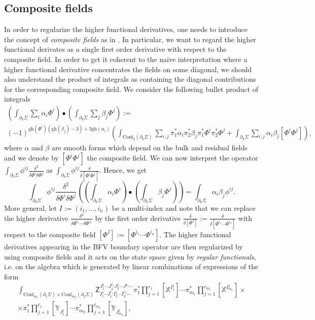 \documentclass[11pt,colorinlistoftodos]{amsart}
\numberwithin{equation}{subsection}
\theoremstyle{plain}
\theoremstyle{definition}
\theoremstyle{remark}
\newcommand{\de}{\partial}
\begin{document}
\subsection{Composite fields}
In order to regularize the higher functional derivatives, one needs to introduce the concept of \emph{composite fields} as in \cite{CMR2}. In particular, we want to regard the higher functional derivates as a single first order derivative with respect to the composite field. In order to get it coherent to the naive interpretation where a higher functional derivative concentrates the fields on some diagonal, we should also understand the product of integrals as containing the diagonal contributions for the corresponding composite field. We consider the following bullet product of integrals
\begin{multline}
\label{eq:bullet_product}
\left(\int_{\de_k\Sigma}\sum_i\alpha_i\Phi^i\right)\bullet\left(\int_{\de_k\Sigma}\sum_j\beta_j\Phi^j\right):=\\
(-1)^{\mathrm{gh}(\Phi^i)(\mathrm{gh}(\beta_j)-3)+3\mathrm{gh}(\alpha_i)}\left(\int_{\overline{\mathrm{Conf}_2(\de_k\Sigma)}}\sum_{i,j}\pi_1^*\alpha_i\pi_2^*\beta_j\pi^*_1\Phi^i\pi^*_2\Phi^j+\int_{\de_k\Sigma}\sum_{i,j}\alpha_i\beta_j[\Phi^i\Phi^j]\right),
\end{multline}
where $\alpha$ and $\beta$ are smooth forms which depend on the bulk and residual fields and we denote by $[\Phi^i\Phi^j]$ the composite field. We can now interpret the operator $\int_{\de_k\Sigma}\phi^{ij}\frac{\delta^2}{\delta\Phi^i\delta\Phi^j}$ as $\int_{\de_k\Sigma}\phi^{ij}\frac{\delta}{\delta[\Phi^i\Phi^j]}$. Hence, we get 
\[
\int_{\de_k\Sigma}\phi^{ij}\frac{\delta^2}{\delta\Phi^i\delta\Phi^j}\left(\left(\int_{\de_k\Sigma}\alpha_i\Phi^i\right)\bullet\left(\int_{\de_k\Sigma}\beta_j\Phi^j\right)\right)=\int_{\de_k\Sigma}\alpha_i\beta_j\phi^{ij}.
\]
More general, let $I:=(i_1,\ldots,i_n)$ be a multi-index and note that we can replace the higher derivative $\frac{\delta^n}{\delta\Phi^{i_1}\dotsm \delta\Phi^{i_n}}$ by the first order derivative $\frac{\delta}{\delta[\Phi^I]}:=\frac{\delta}{\delta[\Phi^{i_1}\dotsm \Phi^{i_n}]}$ with respect to the composite field $[\Phi^I]:=[\Phi^{i_1}\dotsm \Phi^{i_n}]$. The higher functional derivatives appearing in the BFV boundary operator are then regularized by using composite fields and it acts on the state space given by \emph{regular functionals}, i.e. on the algebra which is generated by linear combinations of expressions of the form 
\begin{multline}
\label{eq:condition_1}
\int_{\overline{\mathrm{Conf}_{m_1}(\de_1\Sigma)}\times\overline{\mathrm{Conf}_{m_2}(\de_2\Sigma)}}\mathsf{Z}^{J_1^1\dotsm J_1^{\ell_1}J_2^1\dotsm J^{\ell_2}\dotsm}_{I_1^1\dotsm I_1^{r_1}I_2^{1}\dotsm I_2^{r_2}\dotsm}\pi_1^*\prod_{j=1}^{r_1}\left[\mathds{X}^{I_1^j}\right]\dotsm \pi_{m_1}^*\prod_{j=1}^{r_{m_1}}\left[\mathds{X}^{I^j_{m_1}}\right]\times\\
\times \pi^*_1\prod_{j=1}^{\ell_1}\left[\mathds{Y}_{J^j_1}\right]\dotsm\pi^*_{m_2}\prod_{j=1}^{\ell_{m_2}}\left[\mathds{Y}_{J^j_{m_2}}\right],
\end{multline}
\end{document}

